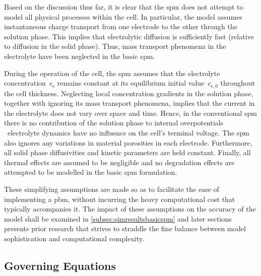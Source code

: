 Based  on the  discussion thus  far, it  is clear  that the  \gls{spm} does  not
attempt to  model all  physical processes  within the  cell. In  particular, the
model assumes  instantaneous charge  transport from one  electrode to  the other
through  the  solution  phase.  This  implies  that  electrolytic  diffusion  is
sufficiently  fast  (relative to  diffusion  in  the  solid phase).  Thus,  mass
transport  phenomena  in  the  electrolyte  have been  neglected  in  the  basic
\gls{spm}.


During   the  operation   of  the   cell,   the  \gls{spm}   assumes  that   the
electrolyte  concentration~$c_\text{e}$  remains  constant  at  its  equilibrium
initial value~$c_{\text{e},0}$  throughout the cell thickness.  Neglecting local
concentration gradients in  the solution phase, together with  ignoring its mass
transport phenomena, implies  that the current in the electrolyte  does not vary
over  space  and  time.  Hence,  in  the  conventional  \gls{spm}  there  is  no
contribution of the solution phase  to internal overpotentials \ie~electrolyte
dynamics have  no influence on the  cell's terminal voltage. The  \gls{spm} also
ignores any  variations in material  porosities in each  electrode. Furthermore,
all solid phase diffusivities and kinetic parameters are held constant. Finally,
all thermal effects are assumed to  be negligible and no degradation effects are
attempted to be modelled in the basic \gls{spm} formulation.

These  simplifying  assumptions  are  made  so as  to  facilitate  the  ease  of
implementing a  \gls{pbm}, without incurring  the heavy computational  cost that
typically accompanies it. The impact of these assumptions on the accuracy of the
model shall  be examined in \cref{subsec:simresultsbasicspm}  and later sections
presents prior research that strives to  straddle the fine balance between model
sophistication and computational complexity.

\subsection{Governing  Equations}\label{subsec:basicspmgoverningeqns}


